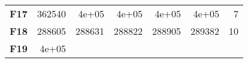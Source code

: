 \documentclass[12pt,a4paper]{article}
\begin{document}
\begin{longtable}[c]{@{}crrrrrr@{}}
\begin{minipage}[t]{0.11\columnwidth}
\textbf{F17}
\strut\end{minipage} &
\begin{minipage}[t]{0.08\columnwidth}\raggedleft\strut
362540
\strut\end{minipage} &
\begin{minipage}[t]{0.08\columnwidth}\raggedleft\strut
4e+05
\strut\end{minipage} &
\begin{minipage}[t]{0.09\columnwidth}\raggedleft\strut
4e+05
\strut\end{minipage} &
\begin{minipage}[t]{0.10\columnwidth}\raggedleft\strut
4e+05
\strut\end{minipage} &
\begin{minipage}[t]{0.11\columnwidth}\raggedleft\strut
4e+05
\strut\end{minipage} &
\begin{minipage}[t]{0.07\columnwidth}\raggedleft\strut
7
\strut\end{minipage}\tabularnewline
\begin{minipage}[t]{0.11\columnwidth}\centering\strut
\textbf{F18}
\strut\end{minipage} &
\begin{minipage}[t]{0.08\columnwidth}\raggedleft\strut
288605
\strut\end{minipage} &
\begin{minipage}[t]{0.08\columnwidth}\raggedleft\strut
288631
\strut\end{minipage} &
\begin{minipage}[t]{0.09\columnwidth}\raggedleft\strut
288822
\strut\end{minipage} &
\begin{minipage}[t]{0.10\columnwidth}\raggedleft\strut
288905
\strut\end{minipage} &
\begin{minipage}[t]{0.11\columnwidth}\raggedleft\strut
289382
\strut\end{minipage} &
\begin{minipage}[t]{0.07\columnwidth}\raggedleft\strut
10
\strut\end{minipage}\tabularnewline
\begin{minipage}[t]{0.11\columnwidth}\centering\strut
\textbf{F19}
\strut\end{minipage} &
\begin{minipage}[t]{0.08\columnwidth}\raggedleft\strut
4e+05
\strut\end{minipage} &
\begin{minipage}[t]{0.08\columnwidth}\raggedleft\strut

\end{minipage}
\end{longtable}
\end{document}
